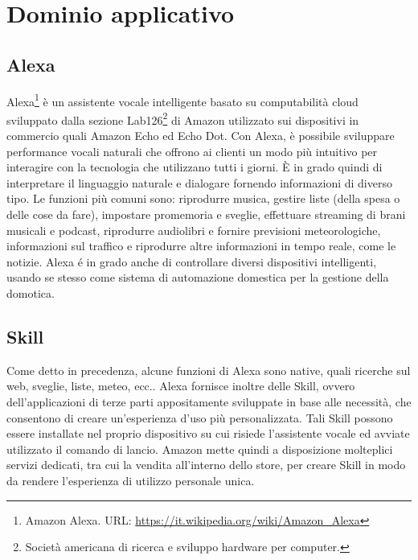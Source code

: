 \section{Dominio applicativo}
\subsection{Alexa}
Alexa\footnote{Amazon Alexa. URL: \href{https://it.wikipedia.org/wiki/Amazon\_Alexa}{https://it.wikipedia.org/wiki/Amazon\_Alexa}} è un assistente vocale intelligente basato su computabilità cloud sviluppato dalla sezione Lab126\footnote{Società americana di ricerca e sviluppo hardware per computer.} di Amazon utilizzato sui dispositivi in commercio quali Amazon Echo ed Echo Dot. Con Alexa, è possibile sviluppare performance vocali naturali che offrono ai clienti un modo più intuitivo per interagire con la tecnologia che utilizzano tutti i giorni. È in grado quindi di interpretare il linguaggio naturale e dialogare fornendo informazioni di diverso tipo. Le funzioni più comuni sono: riprodurre musica, gestire liste (della spesa o delle cose da fare), impostare promemoria e sveglie, effettuare streaming di brani musicali e podcast, riprodurre audiolibri e fornire previsioni meteorologiche, informazioni sul traffico e riprodurre altre informazioni in tempo reale, come le notizie. Alexa é in grado anche di controllare diversi dispositivi intelligenti, usando se stesso come sistema di automazione domestica per la gestione della domotica.

\subsection{Skill}
Come detto in precedenza, alcune funzioni di Alexa sono native, quali ricerche sul web, sveglie, liste, meteo, ecc.. Alexa fornisce inoltre delle Skill, ovvero dell'applicazioni di terze parti appositamente sviluppate in base alle necessità, che consentono di creare un’esperienza d'uso più personalizzata.
Tali Skill possono essere installate nel proprio dispositivo su cui risiede l'assistente vocale ed avviate utilizzato il comando di lancio.
Amazon mette quindi a disposizione molteplici servizi dedicati, tra cui la vendita all'interno dello store, per creare Skill in modo da rendere l'esperienza di utilizzo personale unica.

